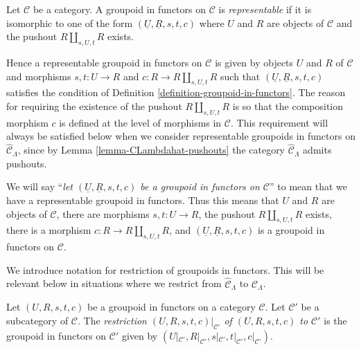 \begin{definition}
\label{definition-representable}
Let $\mathcal{C}$ be a category. A groupoid in functors on $\mathcal{C}$ is
{\it representable} if it is isomorphic to one of the form
$(\underline{U}, \underline{R}, s, t, c)$ where $U$ and $R$ are objects of
$\mathcal{C}$ and the pushout $R \amalg_{s, U, t} R$ exists.
\end{definition}

\begin{remark}
\label{remark-reason-existence-coproduct}
Hence a representable groupoid in functors on $\mathcal{C}$ is given by
objects $U$ and $R$ of $\mathcal{C}$ and morphisms $s, t : U \to R$ and
$c : R \to R \amalg_{s, U, t} R$ such that
$(\underline{U}, \underline{R}, s, t, c)$ satisfies the condition of
Definition \ref{definition-groupoid-in-functors}. The reason for requiring
the existence of the pushout $R \amalg_{s, U, t} R$ is so that the composition
morphism $c$ is defined at the level of morphisms in $\mathcal{C}$.
This requirement will always be satisfied below when we consider
representable groupoids in functors on
$\widehat{\mathcal{C}}_\Lambda$, since by
Lemma \ref{lemma-CLambdahat-pushouts}
the category $\widehat{\mathcal{C}}_\Lambda$ admits pushouts.
\end{remark}

\begin{remark}
\label{remark-simplify-terminology}
We will say ``{\it let $(\underline{U}, \underline{R}, s, t, c)$ be a
groupoid in functors on $\mathcal{C}$}'' to mean that we have
a representable groupoid in functors. Thus this means that
$U$ and $R$ are objects of $\mathcal{C}$, there are morphisms
$s, t : U \to R$, the pushout $R \amalg_{s, U, t} R$ exists,
there is a morphism $c : R \to R \amalg_{s, U, t} R$, and
$(\underline{U}, \underline{R}, s, t, c)$ is a
groupoid in functors on $\mathcal{C}$.
\end{remark}

\noindent
We introduce notation for restriction of groupoids in functors. This will be
relevant below in situations where we restrict from $\widehat{\mathcal
C}_\Lambda$ to $\mathcal{C}_\Lambda$.

\begin{definition}
\label{definition-restricting-groupoids-in-functors}
Let $(U, R, s, t, c)$ be a groupoid in functors on a category $\mathcal{C}$.
Let $\mathcal{C}'$ be a subcategory of $\mathcal{C}$. The
{\it restriction $(U, R, s, t, c)|_{\mathcal{C}'}$ of $(U, R, s, t, c)$
to $\mathcal{C}'$} is the groupoid
in functors on $\mathcal{C}'$ given by $(U|_{\mathcal{C}'}, R|_{\mathcal
C'}, s|_{\mathcal{C}'}, t|_{\mathcal{C}'}, c|_{\mathcal{C}'})$.
\end{definition}

